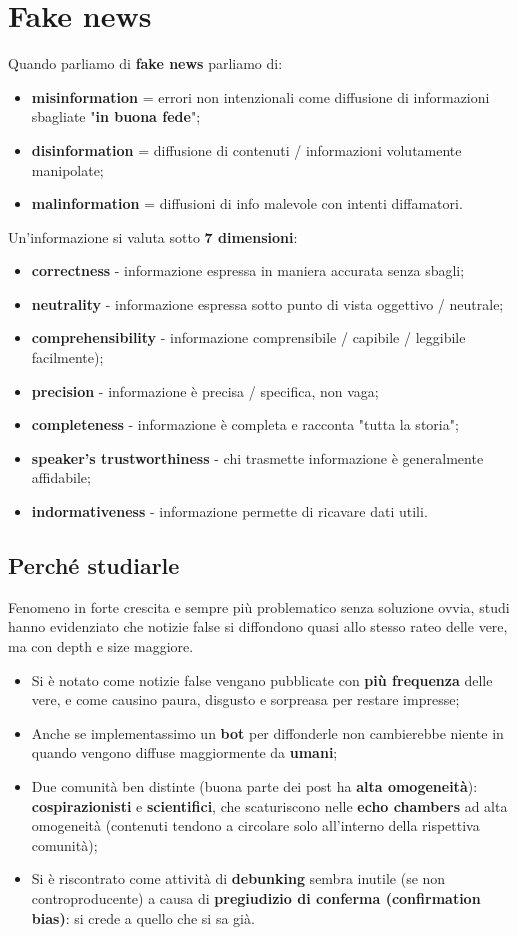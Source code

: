 \documentclass{article}
\begin{document}
\section{Fake news}
  Quando parliamo di \textbf{fake news} parliamo di:
  \begin{itemize}
      \item \textbf{misinformation} = errori non intenzionali come diffusione di informazioni sbagliate "\textbf{in buona fede}";
      \item \textbf{disinformation} = diffusione di contenuti / informazioni volutamente manipolate;
      \item \textbf{malinformation} = diffusioni di info malevole con intenti diffamatori.
  \end{itemize}
  Un'informazione si valuta sotto \textbf{7 dimensioni}:
  \begin{itemize}
      \item \textbf{correctness} - informazione espressa in maniera accurata senza sbagli;
      \item \textbf{neutrality} - informazione espressa sotto punto di vista oggettivo / neutrale;
      \item \textbf{comprehensibility} - informazione comprensibile / capibile / leggibile facilmente);
      \item \textbf{precision} - informazione è precisa / specifica, non vaga;
      \item \textbf{completeness} - informazione è completa e racconta "tutta la storia";
      \item \textbf{speaker's trustworthiness} - chi trasmette informazione è generalmente affidabile;
      \item \textbf{indormativeness} - informazione permette di ricavare dati utili.
  \end{itemize}
  \subsection{Perché studiarle}
    Fenomeno in forte crescita e sempre più problematico senza soluzione ovvia, studi hanno evidenziato che notizie false si diffondono quasi allo stesso rateo delle vere, ma con depth e size maggiore.
    \begin{itemize}
        \item Si è notato come notizie false vengano pubblicate con \textbf{più frequenza} delle vere, e come causino paura, disgusto e sorpreasa per restare impresse;
        \item Anche se implementassimo un \textbf{bot} per diffonderle non cambierebbe niente in quando vengono diffuse maggiormente da \textbf{umani};
        \item Due comunità ben distinte (buona parte dei post ha \textbf{alta omogeneità}): \textbf{cospirazionisti} e \textbf{scientifici}, che scaturiscono nelle \textbf{echo chambers} ad alta omogeneità (contenuti tendono a circolare solo all'interno della rispettiva comunità);
        \item Si è riscontrato come attività di \textbf{debunking} sembra inutile (se non controproducente) a causa di \textbf{pregiudizio di conferma (confirmation bias)}: si crede a quello che si sa già.
    \end{itemize}
\end{document}
